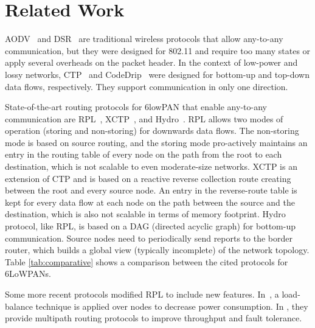 \section{Related Work}
\label{sec:related}

AODV~\cite{perkins2003ad} and DSR~\cite{johnson2007rfc} are
traditional wireless protocols that allow any-to-any communication,
but they were designed for 802.11 and require too many states or
apply several overheads on the packet header.
In the context of low-power and lossy networks, CTP~\cite{Fonseca:2009} and
CodeDrip~\cite{junior2014codedrip} were designed for bottom-up and
top-down data flows, respectively. They support communication in only one
direction.

State-of-the-art routing protocols for 6lowPAN that enable
any-to-any communication are RPL~\cite{rfc6550}, XCTP~\cite{xctp}, and
Hydro~\cite{hydro}. RPL allows two modes of operation (storing and
non-storing) for downwards data flows. The non-storing mode is based
on source routing, and the storing mode pro-actively maintains an
entry in the routing table of every node on the path from the root
to each destination, which is not scalable to even moderate-size
networks. XCTP is an extension of CTP and is based on a reactive
reverse collection route creating between the root and every source
node. An entry in the reverse-route table is kept for every data
flow at each node on the path between the source and the
destination, which is also not scalable in terms of memory
footprint. Hydro protocol, like RPL, is based on a DAG
(directed acyclic graph) for bottom-up communication. Source nodes
need to periodically send reports to the border router, which builds
a global view (typically incomplete) of the network topology. Table \ref{tab:comparative} shows a comparison between the cited protocols for 6LoWPANs.

Some more recent protocols \cite{Palani2015, Moghadam:2015:MMR:2766739.2766774,
7374975} modified RPL to include new features. In~\cite{Palani2015}, a
load-balance technique is applied over nodes to decrease power consumption. In
\cite{Moghadam:2015:MMR:2766739.2766774, 7374975}, they provide multipath
routing protocols to improve throughput and fault tolerance.


